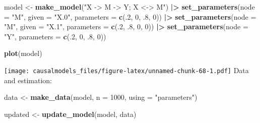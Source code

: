 \documentclass[
  12pt,
]{book}
\newenvironment{Shaded}{\begin{snugshade}}{\end{snugshade}}
\newcommand{\AttributeTok}[1]{\textcolor[rgb]{0.13,0.29,0.53}{#1}}
\newcommand{\DecValTok}[1]{\textcolor[rgb]{0.00,0.00,0.81}{#1}}
\newcommand{\FunctionTok}[1]{\textcolor[rgb]{0.13,0.29,0.53}{\textbf{#1}}}
\newcommand{\NormalTok}[1]{#1}
\newcommand{\OtherTok}[1]{\textcolor[rgb]{0.56,0.35,0.01}{#1}}
\newcommand{\SpecialCharTok}[1]{\textcolor[rgb]{0.81,0.36,0.00}{\textbf{#1}}}
\newcommand{\StringTok}[1]{\textcolor[rgb]{0.31,0.60,0.02}{#1}}
\begin{document}
\begin{Shaded}
\begin{Highlighting}[]
\NormalTok{model }\OtherTok{\textless{}{-}} \FunctionTok{make\_model}\NormalTok{(}\StringTok{"X {-}\textgreater{} M {-}\textgreater{} Y; X \textless{}{-}\textgreater{} M"}\NormalTok{) }\SpecialCharTok{|\textgreater{}}
         \FunctionTok{set\_parameters}\NormalTok{(}\AttributeTok{node =} \StringTok{"M"}\NormalTok{, }\AttributeTok{given =} \StringTok{"X.0"}\NormalTok{, }\AttributeTok{parameters =} \FunctionTok{c}\NormalTok{(.}\DecValTok{2}\NormalTok{, }\DecValTok{0}\NormalTok{, .}\DecValTok{8}\NormalTok{, }\DecValTok{0}\NormalTok{)) }\SpecialCharTok{|\textgreater{}}
         \FunctionTok{set\_parameters}\NormalTok{(}\AttributeTok{node =} \StringTok{"M"}\NormalTok{, }\AttributeTok{given =} \StringTok{"X.1"}\NormalTok{, }\AttributeTok{parameters =} \FunctionTok{c}\NormalTok{(.}\DecValTok{2}\NormalTok{, .}\DecValTok{8}\NormalTok{, }\DecValTok{0}\NormalTok{, }\DecValTok{0}\NormalTok{)) }\SpecialCharTok{|\textgreater{}}
         \FunctionTok{set\_parameters}\NormalTok{(}\AttributeTok{node =} \StringTok{"Y"}\NormalTok{, }\AttributeTok{parameters =} \FunctionTok{c}\NormalTok{(.}\DecValTok{2}\NormalTok{, }\DecValTok{0}\NormalTok{, .}\DecValTok{8}\NormalTok{, }\DecValTok{0}\NormalTok{))}
\end{Highlighting}
\end{Shaded}

\begin{Shaded}
\begin{Highlighting}[]
\FunctionTok{plot}\NormalTok{(model)}
\end{Highlighting}
\end{Shaded}

\texttt{[image: causalmodels\_files/figure-latex/unnamed-chunk-68-1.pdf]}
Data and estimation:

\begin{Shaded}
\begin{Highlighting}[]
\NormalTok{data }\OtherTok{\textless{}{-}} \FunctionTok{make\_data}\NormalTok{(model, }\AttributeTok{n =} \DecValTok{1000}\NormalTok{, }\AttributeTok{using =} \StringTok{"parameters"}\NormalTok{)}
\end{Highlighting}
\end{Shaded}

\begin{Shaded}
\begin{Highlighting}[]
\NormalTok{updated }\OtherTok{\textless{}{-}} \FunctionTok{update\_model}\NormalTok{(model, data)}
\end{Highlighting}
\end{Shaded}
\end{document}
